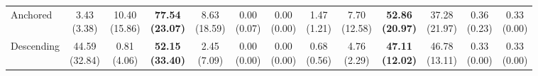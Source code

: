 {\begin{tabular}{l|cccccc|cccccc}
Anchored & \makecell{3.43 \\ (3.38)} & \makecell{10.40 \\ (15.86)} & {\cellcolor[HTML]{C8E6C9}} \bfseries \makecell{77.54 \\ (23.07)} & \makecell{8.63 \\ (18.59)} & \makecell{0.00 \\ (0.07)} & \makecell{0.00 \\ (0.00)} & \makecell{1.47 \\ (1.21)} & \makecell{7.70 \\ (12.58)} & {\cellcolor[HTML]{C8E6C9}} \bfseries \makecell{52.86 \\ (20.97)} & \makecell{37.28 \\ (21.97)} & \makecell{0.36 \\ (0.23)} & \makecell{0.33 \\ (0.00)} \\
Descending & \makecell{44.59 \\ (32.84)} & \makecell{0.81 \\ (4.06)} & {\cellcolor[HTML]{C8E6C9}} \bfseries \makecell{52.15 \\ (33.40)} & \makecell{2.45 \\ (7.09)} & \makecell{0.00 \\ (0.00)} & \makecell{0.00 \\ (0.00)} & \makecell{0.68 \\ (0.56)} & \makecell{4.76 \\ (2.29)} & {\cellcolor[HTML]{C8E6C9}} \bfseries \makecell{47.11 \\ (12.02)} & \makecell{46.78 \\ (13.11)} & \makecell{0.33 \\ (0.00)} & \makecell{0.33 \\ (0.00)} \\
\bottomrule
\end{tabular}
}%
